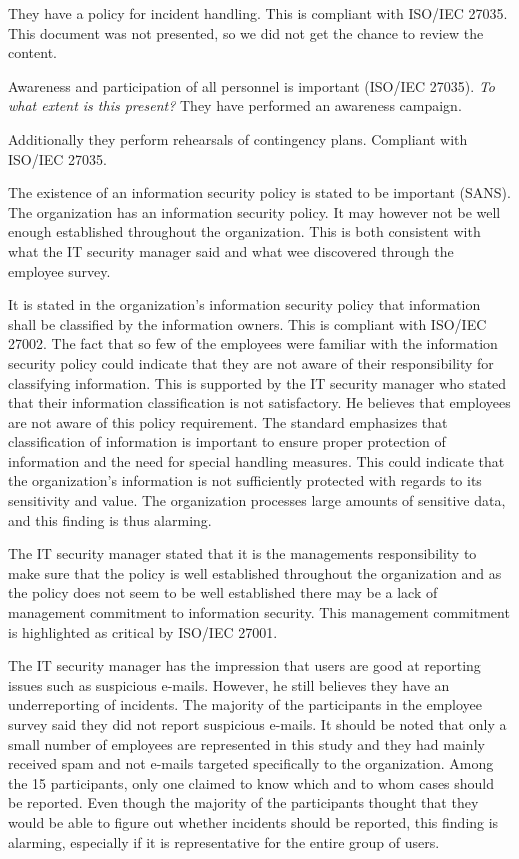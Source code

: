They have a policy for incident handling. This is compliant with ISO/IEC 27035. This document was not presented, so we did not get the chance to review the content.

Awareness and participation of all personnel is important (ISO/IEC 27035). \textit{To what extent is this present?} They have performed an awareness campaign. 

Additionally they perform rehearsals of contingency plans. Compliant with ISO/IEC 27035.

The existence of an information security policy is stated to be important (SANS). The organization has an information security policy. It may however not be well enough established throughout the organization. This is both consistent with what the IT security manager said and what wee discovered through the employee survey.

It is stated in the organization's information security policy that information shall be classified by the information owners. This is compliant with ISO/IEC 27002. The fact that so few of the employees were familiar with the information security policy could indicate that they are not aware of their responsibility for classifying information. This is supported by the IT security manager who stated that their information classification is not satisfactory. He believes that employees are not aware of this policy requirement. The standard emphasizes that classification of information is important to ensure proper protection of information and the need for special handling measures. This could indicate that the organization's information is not sufficiently protected with regards to its sensitivity and value. The organization processes large amounts of sensitive data, and this finding is thus alarming.

The IT security manager stated that it is the managements responsibility to make sure that the policy is well established throughout the organization and as the policy does not seem to be well established there may be a lack of management commitment to information security. This management commitment is highlighted as critical by ISO/IEC 27001. 

The IT security manager has the impression that users are good at reporting issues such as suspicious e-mails. However, he still believes they have an underreporting of incidents. The majority of the participants in the employee survey said they did not report suspicious e-mails. It should be noted that only a small number of employees are represented in this study and they had mainly received spam and not e-mails targeted specifically to the organization. Among the 15 participants, only one claimed to know which and to whom cases should be reported. Even though the majority of the participants thought that they would be able to figure out whether incidents should be reported, this finding is alarming, especially if it is representative for the entire group of users.

